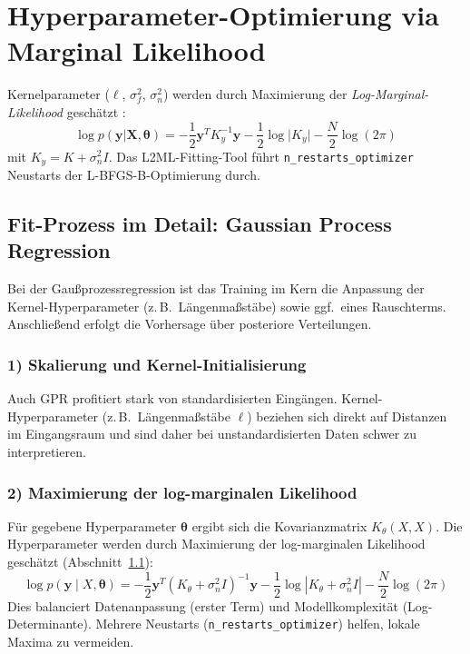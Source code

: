 \documentclass[11pt,a4paper]{report}
\begin{document}
\section{Hyperparameter-Optimierung via Marginal Likelihood}

Kernelparameter ($\ell$, $\sigma_f^2$, $\sigma_n^2$) werden durch Maximierung der
\emph{Log-Marginal-Likelihood} gesch\"{a}tzt \cite{rasmussen2006}:
\begin{equation}
\log p(\mathbf{y}|\mathbf{X}, \boldsymbol{\theta}) =
-\frac{1}{2}\mathbf{y}^T K_y^{-1} \mathbf{y}
-\frac{1}{2}\log\lvert K_y\rvert
-\frac{N}{2}\log(2\pi)
\end{equation}
mit $K_y = K + \sigma_n^2 I$. Das L2ML-Fitting-Tool f\"{u}hrt \texttt{n\_restarts\_optimizer} Neustarts
der L-BFGS-B-Optimierung durch.

\subsection{Fit-Prozess im Detail: Gaussian Process Regression}
\label{sec:gpr_fit_process}

Bei der Gau\ss{}prozessregression ist das Training im Kern die Anpassung der
Kernel-Hyperparameter (z.\,B.\ L\"{a}ngenma\ss{}st\"{a}be) sowie ggf.\ eines Rauschterms.
Anschlie\ss{}end erfolgt die Vorhersage \"{u}ber posteriore Verteilungen.

\subsubsection{1) Skalierung und Kernel-Initialisierung}
Auch GPR profitiert stark von standardisierten Eing\"{a}ngen. Kernel-Hyperparameter
(z.\,B.\ L\"{a}ngenma\ss{}st\"{a}be $\ell$) beziehen sich direkt auf Distanzen im Eingangsraum
und sind daher bei unstandardisierten Daten schwer zu interpretieren.

\subsubsection{2) Maximierung der log-marginalen Likelihood}
F\"{u}r gegebene Hyperparameter $\boldsymbol{\theta}$ ergibt sich die Kovarianzmatrix
$K_\theta(X,X)$. Die Hyperparameter werden durch Maximierung der log-marginalen Likelihood
gesch\"{a}tzt (Abschnitt~\ref{sec:gpr_fit_process}):
\begin{equation}
\log p(\mathbf{y}\mid X,\boldsymbol{\theta})
=
-\frac{1}{2}\mathbf{y}^T(K_\theta+\sigma_n^2 I)^{-1}\mathbf{y}
-\frac{1}{2}\log|K_\theta+\sigma_n^2 I|
-\frac{N}{2}\log(2\pi)
\end{equation}
Dies balanciert Datenanpassung (erster Term) und Modellkomplexit\"{a}t (Log-Determinante).
Mehrere Neustarts (\texttt{n\_restarts\_optimizer}) helfen, lokale Maxima zu vermeiden.
\end{document}
